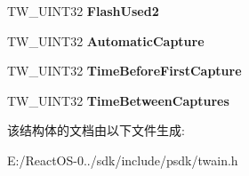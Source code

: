 \begin{DoxyCompactItemize}
\mbox{\label{struct_t_w___d_e_v_i_c_e_e_v_e_n_t_aa9682a47ac323703abf6a5754c338df5}} 
T\+W\+\_\+\+U\+I\+N\+T32 {\bfseries Flash\+Used2}
\item 
\mbox{\label{struct_t_w___d_e_v_i_c_e_e_v_e_n_t_a6f9769b518c7fe3c506c2f94fc396410}} 
T\+W\+\_\+\+U\+I\+N\+T32 {\bfseries Automatic\+Capture}
\item 
\mbox{\label{struct_t_w___d_e_v_i_c_e_e_v_e_n_t_a05259e7dbfabc55a6add66c50ccd0322}} 
T\+W\+\_\+\+U\+I\+N\+T32 {\bfseries Time\+Before\+First\+Capture}
\item 
\mbox{\label{struct_t_w___d_e_v_i_c_e_e_v_e_n_t_a36da19eee03e5799be53e3af37e9f718}} 
T\+W\+\_\+\+U\+I\+N\+T32 {\bfseries Time\+Between\+Captures}
\end{DoxyCompactItemize}


该结构体的文档由以下文件生成\+:\begin{DoxyCompactItemize}
\item 
E\+:/\+React\+O\+S-\/0../sdk/include/psdk/twain.\+h\end{DoxyCompactItemize}

